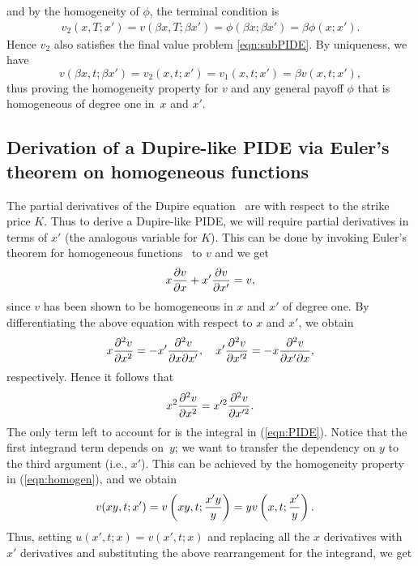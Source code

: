 and by the homogeneity of $\phi$, the terminal condition is
	\begin{align*}
		v_2(x,T;x') = v\left( \beta x, T; \beta x' \right) = \phi(\beta x; \beta x') = \beta \phi(x;x').
	\end{align*}
Hence $v_2$ also satisfies the final value problem \eqref{eqn:subPIDE}. By uniqueness, we have
	\begin{equation*}
		v\left(\beta x, t; \beta x'\right) = v_2(x,t;x') = v_1(x,t;x') = \beta v(x,t;x'),
	\end{equation*}
thus proving the homogeneity property for $v$ and any general payoff $\phi$ that is homogeneous of degree one in~$x$ and $x'$.

\subsection{Derivation of a Dupire-like PIDE via Euler's theorem on homogeneous functions}
The partial derivatives of the Dupire equation~\cite{Gatheral2006} are with respect to the strike price $K$. Thus to derive a Dupire-like PIDE, we will require partial derivatives in terms of $x'$ (the analogous variable for $K$). This can be done by invoking Euler's theorem for homogeneous functions~\cite[pp. 317]{Kishan2007} to $v$ and we get
	\begin{equation*}
		x\frac{\partial v}{\partial x} + x'\frac{\partial v}{\partial x'} = v,
	\end{equation*}
since $v$ has been shown to be homogeneous in $x$ and $x'$ of degree one. By differentiating the above equation with respect to $x$ and $x'$, we obtain
	\begin{equation*}
		x\frac{\partial^2 v}{\partial x^2} = -x'\frac{\partial^2 v}{\partial x \partial x'}, \quad x'\frac{\partial^2 v}{\partial x'^2} = -x\frac{\partial^2 v}{\partial x' \partial x},
	\end{equation*}
respectively. Hence it follows that
	\begin{equation*}
		x^2\frac{\partial^2 v}{\partial x^2} = x'^2\frac{\partial^2 v}{\partial x'^2}.
	\end{equation*}
The only term left to account for is the integral in (\ref{eqn:PIDE}). Notice that the first integrand term depends on~$y$; we want to transfer the dependency on $y$ to the third argument (i.e., $x'$). This can be achieved by the homogeneity property in (\ref{eqn:homogen}), and we obtain
	\begin{align*}
		v(xy,t; x') &= v\left(xy,t;\frac{x'y}{y}\right) = yv\left( x,t;\frac{x'}{y} \right).
	\end{align*}
Thus, setting $u(x',t; x) = v(x',t; x)$ and replacing all the $x$ derivatives with $x'$ derivatives and substituting the above rearrangement for the integrand, we get
